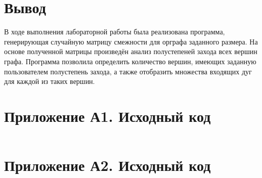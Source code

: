 \documentclass[oneside,a4paper,14pt]{extarticle}
\begin{document}
\section*{Вывод}


В ходе выполнения лабораторной работы была реализована программа, генерирующая случайную матрицу смежности для орграфа заданного размера. На основе полученной матрицы произведён анализ полустепеней захода всех вершин графа. Программа позволила определить количество вершин, имеющих заданную пользователем полустепень захода, а также отобразить множества входящих дуг для каждой из таких вершин.
\newpage
\section*{Приложение А1. Исходный код}
\inputminted{rust}{src/main.rs}

\newpage
\section*{Приложение А2. Исходный код}
\inputminted{rust}{src/graphviz.rs}
\end{document}

